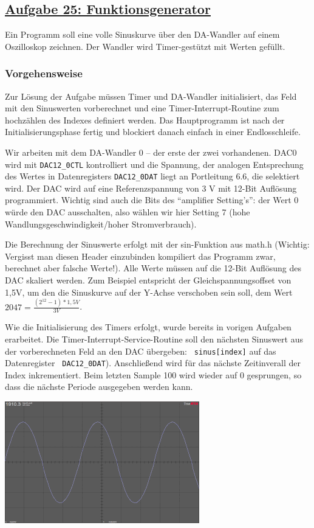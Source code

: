 \subsection
{\href{http://cst.mi.fu-berlin.de/intern/19606-P-MPP/Aufgaben/040901.html}
{Aufgabe 25: Funktionsgenerator}}

Ein Programm soll eine volle Sinuskurve über den DA-Wandler auf einem
Oszilloskop zeichnen. Der Wandler wird Timer-gestützt mit Werten gefüllt.

\subsubsection*{Vorgehensweise}
Zur Lösung der Aufgabe müssen Timer und DA-Wandler initialisiert, das
Feld mit den Sinuswerten vorberechnet und eine Timer-Interrupt-Routine
zum hochzählen des Indexes definiert werden. Das Hauptprogramm ist
nach der Initialisierungsphase fertig und blockiert danach einfach in
einer Endlosschleife.

Wir arbeiten mit dem DA-Wandler 0 -- der erste der zwei vorhandenen. DAC0 wird
mit {\tt DAC12\_\-0CTL} kontrolliert und die Spannung, der analogen
Entsprechung  des Wertes in Datenregisters {\tt DAC12\_\-0DAT} liegt an
Portleitung 6.6, die selektiert wird. Der DAC wird auf eine
Referenzspannung von 3 V mit 12-Bit Auflösung programmiert. Wichtig
sind auch die Bits des ``amplifier Setting's'': der Wert 0 würde den
DAC ausschalten, also wählen wir hier Setting 7 (hohe
Wandlungsgeschwindigkeit/hoher Stromverbrauch).

Die Berechnung der Sinuswerte erfolgt mit der sin-Funktion aus math.h
(Wichtig: Vergisst man diesen Header einzubinden kompiliert das
Programm zwar, berechnet aber falsche Werte!). Alle Werte müssen auf
die 12-Bit Auflösung des DAC skaliert werden. Zum Beispiel entspricht
der Gleichspannungsoffset von 1,5V, um den die Sinuskurve auf der
Y-Achse verschoben sein soll, dem Wert $2047 = \frac{(2^{12}-1) * 1,5V} {3V}$.

Wie die Initialisierung des Timers erfolgt, wurde bereits in vorigen
Aufgaben erarbeitet. Die Timer-Interrupt-Service-Routine soll den nächsten
Sinuswert aus der vorberechneten Feld an den DAC übergeben: {\tt
  sinus[index]} auf das Datenregister {\tt
  DAC12\_\-0DAT}). Anschließend wird für das nächste Zeitinverall der
Index inkrementiert. Beim letzten Sample 100 wird wieder auf 0
gesprungen, so dass die nächste Periode ausgegeben werden kann.

\begin{center}
\includegraphics[scale=0.75]{aufgaben/25.png}
\end {center}

